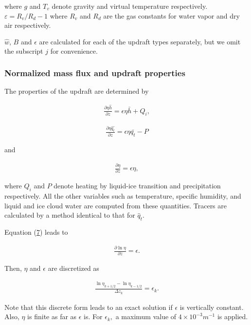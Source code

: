 where \(g\) and \(T_v\) denote gravity and virtual temperature
respectively. \(\varepsilon = R_v/R_d - 1\) where \(R_v\) and \(R_d\)
are the gas constants for water vapor and dry air respectively.

\(\hat{w}\), \(B\) and \(\epsilon\) are calculated for each of the
updraft types separately, but we omit the subscript \(j\) for
convenience.

\hypertarget{normalized-mass-flux-and-updraft-properties}{%
\subsubsection{Normalized mass flux and updraft
properties}\label{normalized-mass-flux-and-updraft-properties}}

The properties of the updraft are determined by

\begin{eqnarray}
 \frac{\partial \eta \hat{h}}{\partial z} = \epsilon \eta \bar{h} + Q_i, \label{p-cum.5}
\end{eqnarray}

\begin{eqnarray}
 \frac{\partial \eta \hat{q_t}}{\partial z} = \epsilon \eta \bar{q_t} - P \label{p-cum.6}
\end{eqnarray}

and

\begin{eqnarray}
 \frac{\partial \eta}{\partial z} = \epsilon \eta, \label{p-cum.7}
\end{eqnarray}

where \(Q_i\) and \(P\) denote heating by liquid-ice transition and
precipitation respectively. All the other variables such as temperature,
specific humidity, and liquid and ice cloud water are computed from
these quantities. Tracers are calculated by a method identical to that
for \(\hat{q}_t\).

Equation (\href{p-cum.7}{7}) leads to

\begin{eqnarray}
 \frac{\partial \ln \eta}{\partial z} = \epsilon.
\end{eqnarray}

Then, \(\eta\) and \(\epsilon\) are discretized as

\begin{eqnarray}
 \frac{\ln \eta_{k+1/2} - \ln \eta_{k-1/2}}{\Delta z_k} = \epsilon_k. \label{p-cum.A1}
\end{eqnarray}

Note that this discrete form leads to an exact solution if \(\epsilon\)
is vertically constant. Also, \(\eta\) is finite as far as \(\epsilon\)
is. For \(\epsilon_k,\) a maximum value of \(4 \times 10^{-3} m^{-1}\)
is applied.

